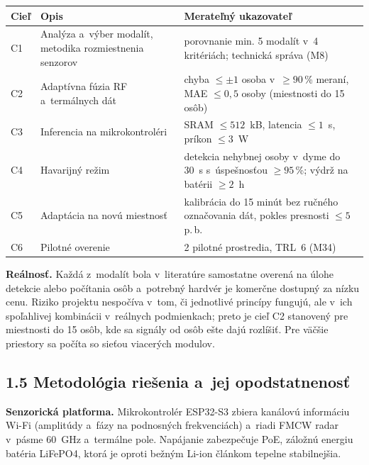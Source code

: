 \documentclass[11pt,a4paper]{article}
\begin{document}
\begin{center}
\small
\begin{tabularx}{\textwidth}{|p{1cm}|L|p{5.4cm}|}
\hline
{}\textbf{Cieľ} & \textbf{Opis} & \textbf{Merateľný ukazovateľ} \\ \hline
C1 & Analýza a~výber modalít, metodika rozmiestnenia senzorov & porovnanie min. 5 modalít v~4 kritériách; technická správa (M8) \\ \hline
C2 & Adaptívna fúzia RF a~termálnych dát & chyba $\leq \pm 1$ osoba v~$\geq 90$\,\% meraní, MAE $\leq 0{,}5$ osoby (miestnosti do 15 osôb) \\ \hline
C3 & Inferencia na mikrokontroléri & SRAM $\leq 512$~kB, latencia $\leq 1$~s, príkon $\leq 3$~W \\ \hline
C4 & Havarijný režim & detekcia nehybnej osoby v~dyme do 30~s s~úspešnosťou $\geq 95$\,\%; výdrž na batérii $\geq 2$~h \\ \hline
C5 & Adaptácia na novú miestnosť & kalibrácia do 15 minút bez ručného označovania dát, pokles presnosti $\leq 5$ p.\,b. \\ \hline
C6 & Pilotné overenie & 2 pilotné prostredia, TRL~6 (M34) \\ \hline
\end{tabularx}
\end{center}

\textbf{Reálnosť.} Každá z~modalít bola v~literatúre samostatne overená na úlohe detekcie alebo počítania osôb a~potrebný hardvér je komerčne dostupný za nízku cenu. Riziko projektu nespočíva v~tom, či jednotlivé princípy fungujú, ale v~ich spoľahlivej kombinácii v~reálnych podmienkach; preto je cieľ C2 stanovený pre miestnosti do 15 osôb, kde sa signály od osôb ešte dajú rozlíšiť. Pre väčšie priestory sa počíta so sieťou viacerých modulov.

\subsection*{1.5 Metodológia riešenia a~jej opodstatnenosť}

\textbf{Senzorická platforma.} Mikrokontrolér ESP32-S3 zbiera kanálovú informáciu Wi-Fi (amplitúdy a~fázy na podnosných frekvenciách) a~riadi FMCW radar v~pásme 60~GHz a~termálne pole. Napájanie zabezpečuje PoE, záložnú energiu batéria LiFePO4, ktorá je oproti bežným Li-ion článkom tepelne stabilnejšia.
\end{document}
